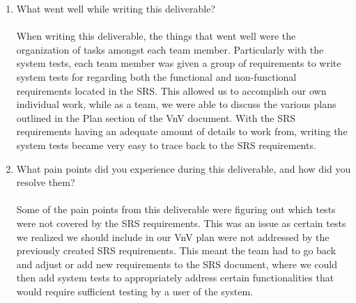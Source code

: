 \documentclass[12pt, titlepage]{article}
\begin{document}
\begin{enumerate}
  \item What went well while writing this deliverable?\\\\
  When writing this deliverable, the things that went well were the organization of tasks
  amongst each team member. Particularly with the system tests, each team member was given
  a group of requirements to write system tests for regarding both the functional and
  non-functional requirements located in the SRS. This allowed us to accomplish our own
  individual work, while as a team, we were able to discuss the various plans outlined in the
  Plan section of the VnV document. With the SRS requirements having an adequate amount of
  details to work from, writing the system tests became very easy to trace back to the SRS
  requirements.
  \item What pain points did you experience during this deliverable, and how
  did you resolve them?\\\\
  Some of the pain points from this deliverable were figuring out which tests were not
  covered by the SRS requirements. This was an issue as certain tests we realized we should
  include in our VnV plan were not addressed by the previously created SRS requirements.
  This meant the team had to go back and adjust or add new requirements to the SRS document,
  where we could then add system tests to appropriately address certain functionalities that
  would require sufficient testing by a user of the system.
\end{enumerate}
\end{document}
